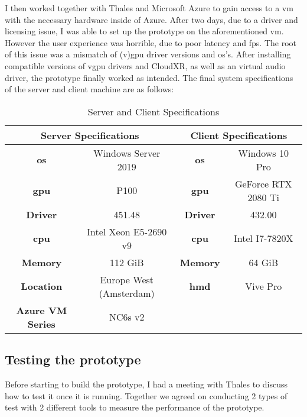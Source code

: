 I then worked together with Thales and Microsoft Azure to gain access to a \acrfull{vm} with the necessary hardware inside of Azure. After two days, due to a driver and licensing issue, I was able to set up the prototype on the aforementioned \acrshort{vm}. However the user experience was horrible, due to poor latency and \acrshort{fps}. The root of this issue was a mismatch of (v)\acrshort{gpu} driver versions and \acrfull{os}'s. After installing compatible versions of v\acrshort{gpu} drivers and CloudXR, as well as an virtual audio driver, the prototype finally worked as intended. The final system specifications of the server and client machine are as follows:

\begin{table}[h!]	
\begin{center}
\caption{Server and Client Specifications}
\begin{tabular}{ |c|c|c|c| } 
\hline
\multicolumn{2}{|c|}{Server Specifications} & \multicolumn{2}{|c|}{Client Specifications}\\ 
\hline\hline
\textbf{\acrshort{os}} & Windows Server 2019  &  \textbf{\acrshort{os}} & Windows 10 Pro\\ 
\hline
\textbf{\acrshort{gpu}} & P100 & \textbf{\acrshort{gpu}} & GeForce RTX 2080 Ti\\ 
\hline
\textbf{Driver} & 451.48 &  \textbf{Driver} & 432.00\\ 
\hline
\textbf{\acrshort{cpu}} & Intel Xeon E5-2690 v9 & \textbf{\acrshort{cpu}} & Intel I7-7820X\\
\hline
\textbf{Memory} & 112 GiB & \textbf{Memory} & 64 GiB\\
\hline
\textbf{Location} & Europe West (Amsterdam) & \textbf{\acrshort{hmd}} & Vive Pro\\
\hline
\textbf{Azure VM Series} & NC6s v2 & & \\
\hline
\end{tabular}
\end{center}
\end{table}

\newpage

\subsection{Testing the prototype}
Before starting to build the prototype, I had a meeting with Thales to discuss how to test it once it is running. Together we agreed on conducting 2 types of test with 2 different tools to measure the performance of the prototype.

